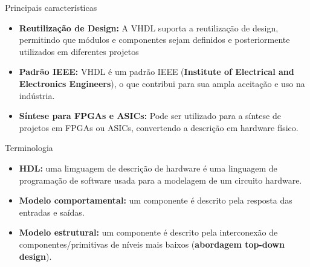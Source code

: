 \documentclass[aspectratio=169]{beamer}
\begin{document}
\begin{frame}{Principais características}
	\justifying
	
	\begin{itemize}
		\justifying

		\item \textbf{Reutilização de Design:} A VHDL suporta a reutilização de design, permitindo que módulos e componentes sejam definidos e posteriormente utilizados em diferentes projetos
		\item \textbf{Padrão IEEE:} VHDL é um padrão IEEE (\textbf{Institute of Electrical and Electronics Engineers}), o que contribui para sua ampla aceitação e uso na indústria.
		\item \textbf{Síntese para FPGAs e ASICs:} Pode ser utilizado para a síntese de projetos em FPGAs ou ASICs, convertendo a descrição em hardware físico.
	\end{itemize}
	
	
\end{frame}










\begin{frame}{Terminologia}
	\justifying
	
	\begin{itemize}
		\justifying
		\item \textbf{HDL:} uma limguagem de descrição de hardware é uma linguagem de programação de software usada para a modelagem de um circuito hardware.
		
		\item \textbf{Modelo comportamental:} um componente é descrito pela resposta das entradas e saídas.
		
		\item \textbf{Modelo estrutural:} um componente é descrito pela interconexão de componentes/primitivas de níveis mais baixos (\textbf{abordagem top-down design}).
		
		
	\end{itemize}
	
	
\end{frame}
\end{document}
